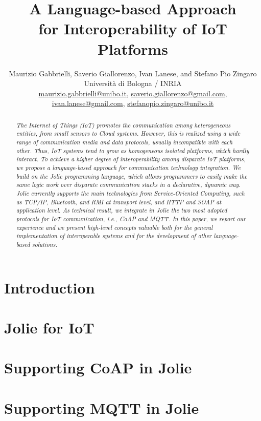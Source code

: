 \documentclass[letterpaper,10pt,final,compsoc]{IEEEtran}
\author{Maurizio Gabbrielli, Saverio Giallorenzo, Ivan Lanese, and Stefano Pio
Zingaro 
\\
Universit\`a di Bologna / INRIA \\
{\underline{maurizio.gabbrielli@unibo.it}, 
  \underline{ saverio.giallorenzo@gmail.com},}\\
  {\underline{ivan.lanese@gmail.com},
  \underline{stefanopio.zingaro@unibo.it}
  } \\
}
\title{\LARGE \bf A Language-based Approach \\ for Interoperability of IoT
Platforms}
\begin{document}
\maketitle

\begin{abstract}
\normalfont\itshape The Internet of Things (IoT) promotes the communication
among heterogeneous entities, from small sensors to Cloud systems. However,
this is realized using a wide range of communication media and data protocols,
usually incompatible with each other. Thus, IoT systems tend to grow as
homogeneous isolated platforms, which hardly interact. To achieve a higher
degree of interoperability among disparate IoT platforms, we propose a
language-based approach for communication technology integration. We build on
the Jolie programming language, which allows programmers to easily make the
same logic work over disparate communication stacks in a declarative, dynamic
way. Jolie currently supports the main technologies from Service-Oriented
Computing, such as TCP/IP, Bluetooth, and RMI at transport level, and HTTP and
SOAP at application level. As technical result, we integrate in Jolie the two
most adopted protocols for IoT communication, i.e., CoAP and MQTT. In this
paper, we report our experience and we present high-level concepts valuable
both for the general implementation of interoperable systems and for the
development of other language-based solutions.
\end{abstract}

\section{Introduction}
\label{sec:intro}


\section{Jolie for IoT}
\label{sec:challenges}


\section{Supporting CoAP in Jolie}
\label{sub:coap}


\section{Supporting MQTT in Jolie}
\label{sub:mqtt}

\end{document}
